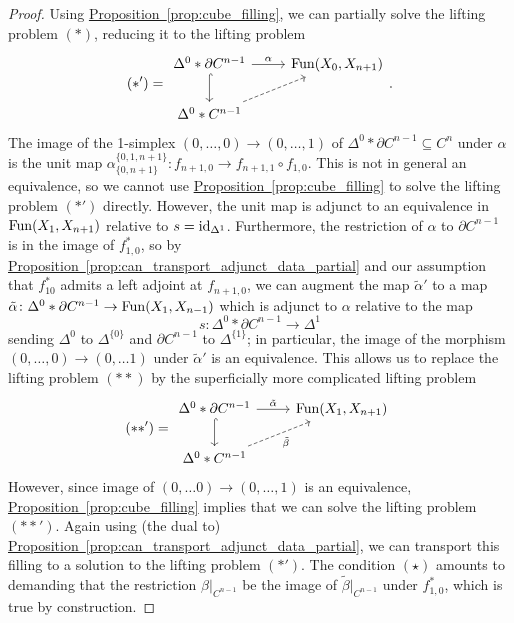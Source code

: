 \documentclass[main.tex]{subfiles}
\begin{document}
\begin{proof}
  Using \hyperref[prop:cube_filling]{Proposition~\ref*{prop:cube_filling}}, we can partially solve the lifting problem $(*)$, reducing it to the lifting problem
  \begin{equation*}
    (*') =
    \begin{tikzcd}
      \Delta^{0} \ast \partial C^{n-1}
      \arrow[r, "\alpha"]
      \arrow[d, hook]
      & \Fun(X_{0}, X_{n+1})
      \\
      \Delta^{0} \ast C^{n-1}
      \arrow[ur, dashed]
    \end{tikzcd}.
  \end{equation*}
  The image of the 1-simplex $(0, \ldots, 0) \to (0, \ldots, 1)$ of $\Delta^{0} \ast \partial C^{n-1} \subseteq C^{n}$ under $\alpha$ is the unit map $\alpha^{\{0, 1, n+1\}}_{\{0, n+1\}}\colon f_{n+1, 0} \to f_{n+1, 1} \circ f_{1, 0}$. This is not in general an equivalence, so we cannot use \hyperref[prop:cube_filling]{Proposition~\ref*{prop:cube_filling}} to solve the lifting problem $(*')$ directly. However, the unit map is adjunct to an equivalence in $\mathrm{Fun}(X_{1}, X_{n+1})$ relative to $s = \mathrm{id}_{\Delta^{1}}$. Furthermore, the restriction of $\alpha$ to $\partial C^{n-1}$ is in the image of $f^{*}_{1,0}$, so by \hyperref[prop:can_transport_adjunct_data_partial]{Proposition~\ref*{prop:can_transport_adjunct_data_partial}} and our assumption that $f_{10}^{*}$ admits a left adjoint at $f_{n+1,0}$, we can augment the map $\tilde{\alpha}'$ to a map $\tilde{\alpha}\colon \Delta^{0} \ast \partial C^{n-1} \to \mathrm{Fun}(X_{1}, X_{n-1})$ which is adjunct to $\alpha$ relative to the map
  \begin{equation*}
    s\colon \Delta^{0} \ast \partial C^{n-1} \to \Delta^{1}
  \end{equation*}
  sending $\Delta^{0}$ to $\Delta^{\{0\}}$ and $\partial C^{n-1}$ to $\Delta^{\{1\}}$; in particular, the image of the morphism $(0, \ldots, 0) \to (0, \ldots 1)$ under $\tilde{\alpha}'$ is an equivalence. This allows us to replace the lifting problem $(**)$ by the superficially more complicated lifting problem
  \begin{equation*}
    (**') =
    \begin{tikzcd}
      \Delta^{0} \ast \partial C^{n-1}
      \arrow[r, "\tilde{\alpha}"]
      \arrow[d, hook]
      & \Fun(X_{1}, X_{n+1})
      \\
      \Delta^{0} \ast C^{n-1}
      \arrow[ur, dashed, swap, "\tilde{\beta}"]
    \end{tikzcd}
  \end{equation*}
  However, since image of $(0, \ldots 0) \to (0, \ldots, 1)$ is an equivalence, \hyperref[prop:cube_filling]{Proposition~\ref*{prop:cube_filling}} implies that we can solve the lifting problem $(**')$. Again using (the dual to) \hyperref[prop:can_transport_adjunct_data_partial]{Proposition~\ref*{prop:can_transport_adjunct_data_partial}}, we can transport this filling to a solution to the lifting problem $(*')$. The condition $(\star)$ amounts to demanding that the restriction $\beta|_{C^{n-1}}$ be the image of $\tilde{\beta}|_{C^{n-1}}$ under $f_{1,0}^{*}$, which is true by construction.
\end{proof}
\end{document}
